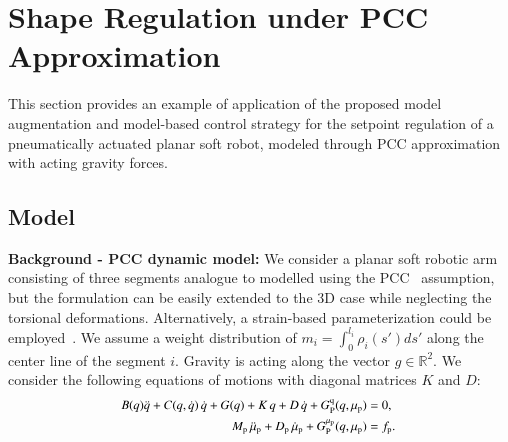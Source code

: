 \section{Shape Regulation under PCC Approximation}
%
This section provides an example of application of the proposed model augmentation and model-based control strategy for the setpoint regulation of a pneumatically actuated planar soft robot, modeled through \gls{PCC} approximation with acting gravity forces. 

\subsection{Model}\label{sub:backstepping:pcc_model}
\textbf{Background - PCC dynamic model:}
We consider a planar soft robotic arm consisting of three segments analogue to \cite{della2020model} modelled using the \gls{PCC}~\cite{jones2006kinematics} assumption, but the formulation can be easily extended to the 3D case while neglecting the torsional deformations. Alternatively, a strain-based parameterization could be employed~\cite{boyer2020dynamics}. 
We assume a weight distribution of $m_i = \int_{0}^{l_i} \rho_i(s') ds'$ along the center line of the segment $i$. Gravity is acting along the vector $g \in \mathbb{R}^2$. We consider the following equations of motions with diagonal matrices $K$ and $D$:
\begin{equation}\small\label{eq:backstepping:dynamics_pcc_case}\small
\begin{split}
	B(q)\ddot{q} + C(q,\dot{q}) \, \dot{q} + G(q) + K \, q + D \, \dot{q} + G_{\mathrm{P}}^{\mathrm{q}}(q,\mu_\mathrm{p}) &= 0, \\
	M_\mathrm{p} \, \ddot{\mu}_\mathrm{p} + D_\mathrm{p} \, \dot{\mu}_\mathrm{p} + G_{\mathrm{P}}^{\mu_\mathrm{p}}(q,\mu_\mathrm{p}) &= f_\mathrm{p}. \; 
\end{split}
\end{equation}

